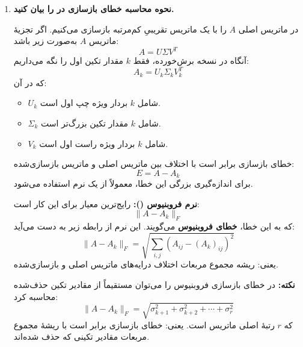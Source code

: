 \documentclass{article}
\begin{document}
\begin{enumerate}
    \vspace{0.4cm}
    \textbf{دلیل استفاده از نقطه زانو:}
    \vspace{0.2cm}
    \begin{itemize}
        \item \textbf{حفظ اطلاعات مهم:} مقادیر تکین بزرگ‌تر معمولاً بیانگر ساختار اصلی داده هستند.
        \item \textbf{حذف نویز و کاهش پیچیدگی:} مقادیر تکین کوچک‌تر معمولاً شامل جزئیات کم‌اهمیت یا نویز هستند.
    \end{itemize}
    پس با انتخاب نقطهٔ زانویی، سعی می‌کنیم تا جایی مؤلفه‌ها را نگه داریم که هنوز اطلاعات قابل‌توجهی اضافه می‌کنند.

    \vspace{0.5cm}
    \item \textbf{نحوه محاسبه خطای بازسازی در  را بیان کنید.}

    \vspace{0.3cm}
    در  ماتریس اصلی $A$ را با یک ماتریس تقریبیِ کم‌مرتبه بازسازی می‌کنیم. اگر تجزیهٔ  ماتریس $A$ به‌صورت زیر باشد:
    \[
    A = U \Sigma V^T
    \]
    آنگاه در نسخه برش‌خورده، فقط $k$ مقدار تکین اول را نگه می‌داریم:
    \[
    A_k = U_k \Sigma_k V_k^T
    \]
    که در آن:
    \begin{itemize}
        \item $U_k$ شامل $k$ بردار ویژه چپ اول است.
        \item $\Sigma_k$ شامل $k$ مقدار تکین بزرگ‌تر است.
        \item $V_k$ شامل $k$ بردار ویژه راست اول است.
    \end{itemize}

    خطای بازسازی برابر است با اختلاف بین ماتریس اصلی و ماتریس بازسازی‌شده:
    \[
    E = A - A_k
    \]
    برای اندازه‌گیری بزرگی این خطا، معمولاً از یک نرم استفاده می‌شود.

    \textbf{نرم فروبنیوس ():} 
    رایج‌ترین معیار برای این کار است:
    \[
    \|A - A_k\|_F
    \]
    که به این خطا، \textbf{خطای فروبنیوس} می‌گویند. این نرم از رابطه زیر به دست می‌آید:
    \[
    \|A - A_k\|_F = \sqrt{\sum_{i,j} \left( A_{ij} - (A_k)_{ij} \right)^2}
    \]
    یعنی: ریشه مجموع مربعات اختلاف درایه‌های ماتریس اصلی و بازسازی‌شده.

    \textbf{نکته:} در  خطای بازسازی فروبنیوس را می‌توان مستقیماً از مقادیر تکین حذف‌شده محاسبه کرد:
    \[
    \|A-A_k\|_F = \sqrt{\sigma_{k+1}^{2}+\sigma_{k+2}^{2}+\cdots+\sigma_{r}^{2}}
    \]
    که $r$ رتبهٔ اصلی ماتریس است. یعنی: خطای بازسازی برابر است با ریشهٔ مجموع مربعات مقادیر تکینی که حذف شده‌اند.


\end{enumerate}
\end{document}
